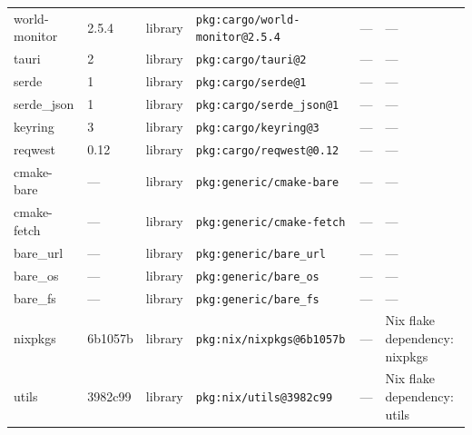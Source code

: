 \documentclass[11pt]{article}
\begin{document}
\begin{longtable}{|l|l|l|p{2.2cm}|l|p{4cm}|}
world-monitor & 2.5.4 & library & \texttt{pkg:cargo/world-monitor@2.5.4} & — & — \\
tauri & 2 & library & \texttt{pkg:cargo/tauri@2} & — & — \\
serde & 1 & library & \texttt{pkg:cargo/serde@1} & — & — \\
serde\_json & 1 & library & \texttt{pkg:cargo/serde\_json@1} & — & — \\
keyring & 3 & library & \texttt{pkg:cargo/keyring@3} & — & — \\
reqwest & 0.12 & library & \texttt{pkg:cargo/reqwest@0.12} & — & — \\
cmake-bare & — & library & \texttt{pkg:generic/cmake-bare} & — & — \\
cmake-fetch & — & library & \texttt{pkg:generic/cmake-fetch} & — & — \\
bare\_url & — & library & \texttt{pkg:generic/bare\_url} & — & — \\
bare\_os & — & library & \texttt{pkg:generic/bare\_os} & — & — \\
bare\_fs & — & library & \texttt{pkg:generic/bare\_fs} & — & — \\
nixpkgs & 6b1057b & library & \texttt{pkg:nix/nixpkgs@6b1057b} & — & Nix flake dependency: nixpkgs \\
utils & 3982c99 & library & \texttt{pkg:nix/utils@3982c99} & — & Nix flake dependency: utils \\
\hline
\end{longtable}
\end{document}
